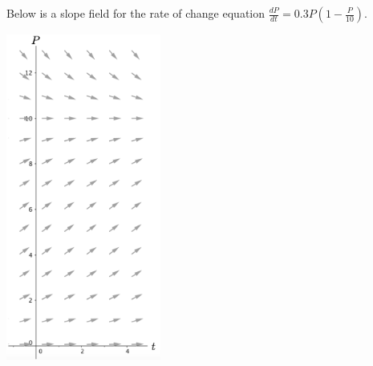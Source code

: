 Below is a slope field for the rate of change equation $\displaystyle \frac{dP}{dt}=0.3P\left(1-\frac{P}{10}\right).$ 
\begin{center}
\includegraphics[width=2in]{02/02SlopeFieldFish.png}
\end{center}
 

